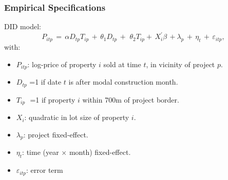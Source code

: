 \documentclass[aspectratio=32]{beamer}
\begin{document}

\begin{frame}
\frametitle{Empirical Specifications}
DID model:
\begin{equation*}
P_{itp} \, = \, \alpha D_{tp}T_{ip} \, + \,\theta_1 D_{tp} \, + \, \,\theta_2 T_{ip}+ \, X^{'}_{i}\beta \, +  \lambda_p \,  + \, \eta_{t} \, + \, \varepsilon_{itp} ,
\end{equation*}
with:
\begin{itemize}
\item $P_{itp}$: log-price of property $i$ sold at time $t$, in vicinity of project $p$.
\item $D_{tp}$ =1 if date $t$ is after modal construction month. 
\item $T_{ip}\,\,$ =1 if property $i$ within 700m of project border.
\item $X_{i}$: quadratic in lot size of property $i$.
\item $\lambda_p$: project fixed-effect.
\item $\eta_{t}$: time (year$\,\times\,$month) fixed-effect.

\item $\varepsilon_{itp}$: error term
\end{itemize}
\end{frame}

\end{document}
